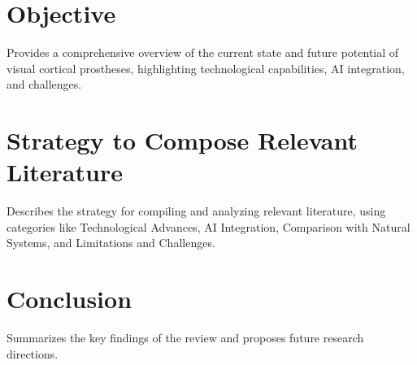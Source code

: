 \documentclass[twocolumn,10pt]{article}
\begin{document}
\section{Objective}\label{sec:objective}
Provides a comprehensive overview of the current state and future potential of visual cortical prostheses, highlighting technological capabilities, AI integration, and challenges.

\section{Strategy to Compose Relevant Literature}\label{sec:strategy}
Describes the strategy for compiling and analyzing relevant literature, using categories like Technological Advances, AI Integration, Comparison with Natural Systems, and Limitations and Challenges.

\section{Conclusion}\label{sec:conclusion}
Summarizes the key findings of the review and proposes future research directions.

\printbibliography
\end{document}
